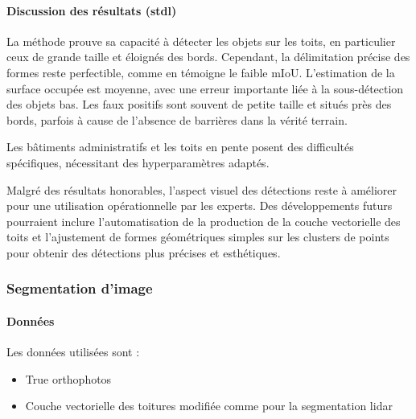 {{{{\paragraph{Discussion des résultats (\acrshort{stdl})}
\par{La méthode prouve sa capacité à détecter les objets sur les toits, en particulier ceux de grande taille et éloignés des bords. Cependant, la délimitation précise des formes reste perfectible, comme en témoigne le faible mIoU. L'estimation de la surface occupée est moyenne, avec une erreur importante liée à la sous-détection des objets bas. Les faux positifs sont souvent de petite taille et situés près des bords, parfois à cause de l'absence de barrières dans la vérité terrain.}
\par{Les bâtiments administratifs et les toits en pente posent des difficultés spécifiques, nécessitant des hyperparamètres adaptés.}
\par{Malgré des résultats honorables, l'aspect visuel des détections reste à améliorer pour une utilisation opérationnelle par les experts. Des développements futurs pourraient inclure l'automatisation de la production de la couche vectorielle des toits et l'ajustement de formes géométriques simples sur les clusters de points pour obtenir des détections plus précises et esthétiques.}

\newpage
\subsubsection{Segmentation d'image}

\paragraph{Données}

\par{Les données utilisées sont :}
\begin{itemize}
    \item True orthophotos \cite{sitg_orthophotos_nodate}
    \item Couche vectorielle des toitures modifiée comme pour la segmentation \gls{lidar}
\end{itemize}

}}}}

